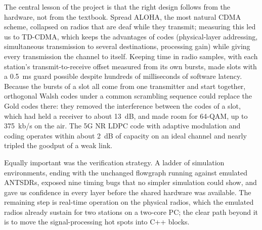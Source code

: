 \documentclass[11pt,a4paper,oneside]{report}
\begin{document}
The central lesson of the project is that the right design follows from the hardware, not from the
textbook. Spread ALOHA, the most natural CDMA scheme, collapsed on radios that are deaf while they
transmit; measuring this led us to TD-CDMA, which keeps the advantages of codes (physical-layer
addressing, simultaneous transmission to several destinations, processing gain) while giving every
transmission the channel to itself. Keeping time in radio samples, with each station's
transmit-to-receive offset measured from its own bursts, made slots with a \SI{0.5}{ms} guard possible
despite hundreds of milliseconds of software latency. Because the bursts of a slot all come from one
transmitter and start together, orthogonal Walsh codes under a common scrambling sequence could replace
the Gold codes there: they removed the interference between the codes of a slot, which had held a
receiver to about \SI{13}{dB}, and made room for 64-QAM, up to \SI{375}{kb/s} on the air. The 5G NR LDPC
code with adaptive modulation and coding operates within about \SI{2}{dB} of capacity on an ideal channel
and nearly tripled the goodput of a weak link.

Equally important was the verification strategy. A ladder of simulation environments, ending with the
unchanged flowgraph running against emulated ANTSDRs, exposed nine timing bugs that no simpler
simulation could show, and gave us confidence in every layer before the shared hardware was available.
The remaining step is real-time operation on the physical radios, which the emulated radios already
sustain for two stations on a two-core PC; the clear path beyond it is to move the signal-processing hot
spots into C++ blocks.
\end{document}
